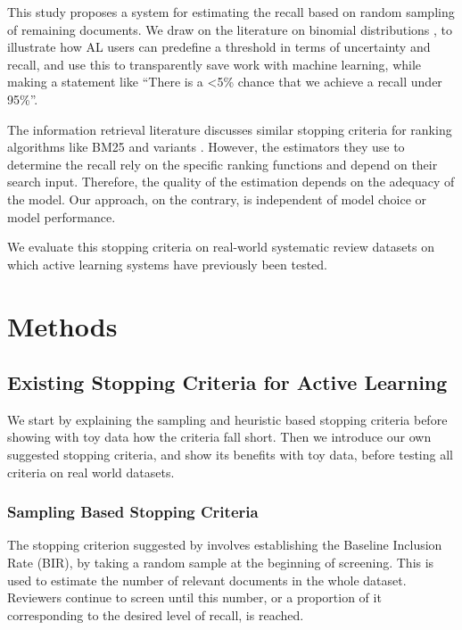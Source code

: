 \documentclass{bmcart}
\begin{document}
	This study proposes a system for estimating the recall based on random sampling of remaining documents. 
	We draw on the literature on binomial distributions \cite{Brown2001}, to illustrate how AL users can predefine a threshold in terms of uncertainty and recall, and use this to transparently save work with machine learning, while making a statement like ``There is a <5\% chance that we achieve a recall under 95\%''.
	
	The information retrieval literature discusses similar stopping criteria for ranking algorithms like BM25 and variants \cite{DiNunzio2018, Yu2019}. However, the estimators they use to determine the recall rely on the specific ranking functions and depend on their search input. Therefore, the quality of the estimation depends on the adequacy of the model. Our approach, on the contrary, is independent of model choice or model performance. 
	
	We evaluate this stopping criteria on real-world systematic review datasets on which active learning systems have previously been tested.
	
	\section*{Methods}
	
	\subsection*{Existing Stopping Criteria for Active Learning}
	
	We start by explaining the sampling and heuristic based stopping criteria before showing with toy data how the criteria fall short. 
	Then we introduce our own suggested stopping criteria, and show its benefits with toy data, before testing all criteria on real world datasets.
	
	\subsubsection*{Sampling Based Stopping Criteria}
	
	The stopping criterion suggested by \cite{Shemilt2014} involves establishing the Baseline Inclusion Rate (BIR), by taking a random sample at the beginning of screening. 
	This is used to estimate the number of relevant documents in the whole dataset. 
	Reviewers continue to screen until this number, or a proportion of it corresponding to the desired level of recall, is reached.
	
\end{document}

